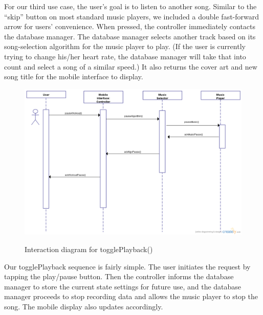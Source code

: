 \documentclass[letterpaper,english, 12pt]{scrreprt}
\begin{document}
For our third use case, the user's goal is to listen to another song. Similar to the ``skip'' button on most standard music players, we included a double fast-forward arrow for users' convenience. When pressed, the controller immediately contacts the database manager. The database manager selects another track based on its song-selection algorithm for the music player to play. (If the user is currently trying to change his/her heart rate, the database manager will take that into count and select a song of a similar speed.) It also returns the cover art and new song title for the mobile interface to display.

\begin{figure}[H]
	\includegraphics[scale=.40]{img/Interaction_Diagrams/newUC4.png}\\
	\caption {Interaction diagram for togglePlayback()} 
\end{figure}

Our togglePlayback sequence is fairly simple. The user initiates the request by tapping the play/pause button. Then the controller informs the database manager to store the current state settings for future use, and the database manager proceeds to stop recording data and allows the music player to stop the song. The mobile display also updates accordingly.
\end{document}
